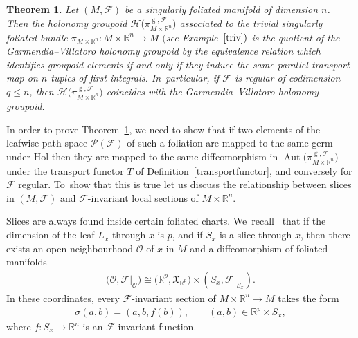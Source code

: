 \documentclass[10pt,a4paper]{amsart}
\numberwithin{equation}{section}
\newtheorem{Theorem}{Theorem}[section]
\def\g{\operatorname{g}}
\def\Aut{\operatorname{Aut}}
\def\FF{{\mathcal{F}}}
\def\HH{{\mathcal{H}}}
\def\PP{{\mathcal{P}}}
\def\OO{{\mathcal{O}}}
\def\RB{{\mathbb{R}}}
\def\XF{{\mathfrak{X}}}
\begin{document}
\begin{Theorem}\label{agree}
Let $(M,\FF)$ be a singularly foliated manifold of dimension $n$. Then the holonomy groupoid $\HH\big(\pi_{M\times\RB^{n}}^{\g,\FF}\big)$ associated to the trivial singularly foliated bundle \mbox{$\pi_{M\times\RB^{n}}\colon M\times\RB^{n}\rightarrow M$} $($see Example~$\ref{triv})$ is the quotient of the Garmendia--Villatoro holonomy groupoid by the equivalence relation which identifies groupoid elements if and only if they induce the same parallel transport map on $n$-tuples of first integrals. In~particular, if $\FF$ is regular of codimension $q\leq n$, then $\HH\big(\pi_{M\times\RB^{n}}^{\g,\FF}\big)$ coincides with the Garmendia--Villatoro holonomy groupoid.
\end{Theorem}

In order to prove Theorem~\ref{agree}, we need to show that if two elements of the leafwise path space $\PP(\FF)$ of such a foliation are mapped to the same germ under $\text{Hol}$ then they are mapped to the same diffeomorphism in $\Aut\big(\pi_{M\times\RB^{n}}^{\g,\FF}\big)$ under the transport functor $T$ of Definition~\ref{transportfunctor}, and conversely for $\FF$ regular. To~show that this is true let us discuss the relationship between slices in $(M,\FF)$ and $\FF$-invariant local sections of $M\times\RB^{n}$.

Slices are always found inside certain foliated charts. We~recall~\cite[Proposition~1.3]{iakovos4} that if the dimension of the leaf $L_{x}$ through $x$ is $p$, and if $S_{x}$ is a slice through $x$, then there exists an open neighbourhood $\OO$ of $x$ in $M$ and a diffeomorphism of foliated manifolds
\begin{gather}\label{chart}
\big(\OO,\FF|_{\OO}\big)\cong\big(\RB^{p},\XF_{\RB^{p}}\big)\times(S_{x},\FF|_{S_{x}}).
\end{gather}
In these coordinates, every $\FF$-invariant section of $M\times\RB^{n}\rightarrow M$ takes the form
\begin{gather}\label{sigmaf}
\sigma(a,b) = (a,b,f(b)),\qquad (a,b)\in\RB^{p}\times S_{x},
\end{gather}
where $f\colon S_{x}\rightarrow\RB^{n}$ is an $\FF$-invariant function.
\end{document}
